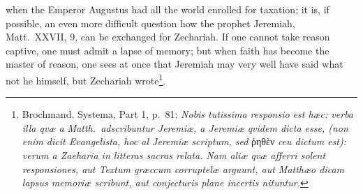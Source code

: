 \documentclass[12pt,a4paper]{article}
\begin{document}
when the Emperor Augustus had all the world enrolled for taxation; it is, if
possible, an even more difficult question how the prophet Jeremiah,
Matt.\ XXVII, 9, can be exchanged for Zechariah. If one cannot
take reason captive, one must admit a lapse of
memory; but when faith has become the master of reason, one sees
at once that Jeremiah may very well have said what not he himself,
but Zechariah wrote\footnote{Brochmand. Systema, Part 1,
p.\ 81: \textit{Nobis tutissima responsio est hæc: verba illa qvæ a Matth.\
adscribuntur Jeremiæ, a Jeremiæ qvidem dicta esse, (non enim dicit
Evangelista, hoc al Jeremiæ scriptum, sed}
ῥηθὲν \textit{ceu dictum est): verum a
Zaeharia in litteras sacras relata. Nam aliæ qvæ afferri solent
responsiones, aut Textum græccum corruptelæ arguunt, aut Matthæo
dicam lapsus memoriæ scribunt, aut conjecturis plane incertis
nituntur.}}. %
\end{document}
